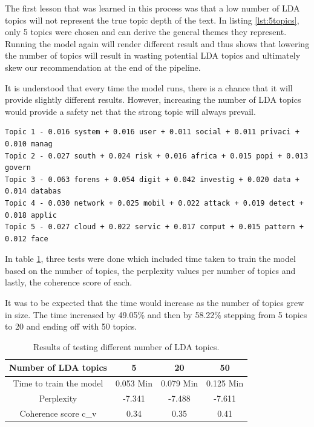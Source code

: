 The first lesson that was learned in this process was that a low number of LDA topics will not represent the true topic depth of the text. In listing \ref{lst:5topics}, only 5 topics were chosen and can derive the general themes they represent. Running the model again will render different result and thus shows that lowering the number of topics will result in wasting potential LDA topics and ultimately skew our recommendation at the end of the pipeline.

It is understood that every time the model runs, there is a chance that it will provide slightly different results. However, increasing the number of LDA topics would provide a safety net that the strong topic will always prevail.
\begin{lstlisting}[language=Text, label={lst:5topics}, caption=5 Number of topics]
Topic 1 - 0.016 system + 0.016 user + 0.011 social + 0.011 privaci + 0.010 manag
Topic 2 - 0.027 south + 0.024 risk + 0.016 africa + 0.015 popi + 0.013 govern
Topic 3 - 0.063 forens + 0.054 digit + 0.042 investig + 0.020 data + 0.014 databas
Topic 4 - 0.030 network + 0.025 mobil + 0.022 attack + 0.019 detect + 0.018 applic
Topic 5 - 0.027 cloud + 0.022 servic + 0.017 comput + 0.015 pattern + 0.012 face
\end{lstlisting}

In table \ref{tab:numtopics}, three tests were done which included time taken to train the model based on the number of topics, the perplexity values per number of topics and lastly, the coherence score of each.

It was to be expected that the time would increase as the number of topics grew in size. The time increased by 49.05\% and then by 58.22\% stepping from 5 topics to 20 and ending off with 50 topics.

\begin{table}[]
\centering
\begin{tabular}{|c|c|c|c|}
\hline
\multicolumn{1}{|l|}{Number of LDA topics} & 5 & 20 & 50 \\ \hline
Time to train the model & 0.053 Min & 0.079 Min & 0.125 Min \\ \hline
Perplexity & -7.341 & -7.488 & -7.611 \\ \hline
Coherence score c\_v & 0.34 & 0.35 & 0.41 \\ \hline
\end{tabular}
\caption{Results of testing different number of LDA topics.}
\label{tab:numtopics}
\end{table}

